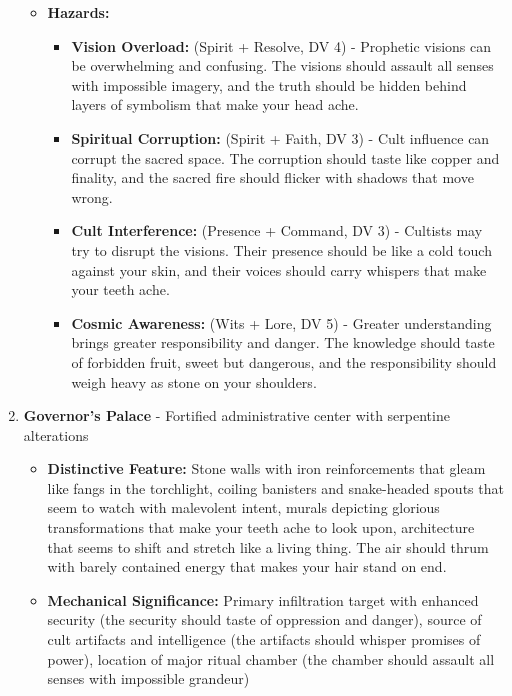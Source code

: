 \documentclass[11pt]{article}
\begin{document}
\begin{enumerate}
\begin{itemize}
  \item \textbf{Hazards:}
    \begin{itemize}
    \item \textbf{Vision Overload:} (Spirit + Resolve, DV 4) - Prophetic visions can be overwhelming and confusing. The visions should assault all senses with impossible imagery, and the truth should be hidden behind layers of symbolism that make your head ache.
    \item \textbf{Spiritual Corruption:} (Spirit + Faith, DV 3) - Cult influence can corrupt the sacred space. The corruption should taste like copper and finality, and the sacred fire should flicker with shadows that move wrong.
    \item \textbf{Cult Interference:} (Presence + Command, DV 3) - Cultists may try to disrupt the visions. Their presence should be like a cold touch against your skin, and their voices should carry whispers that make your teeth ache.
    \item \textbf{Cosmic Awareness:} (Wits + Lore, DV 5) - Greater understanding brings greater responsibility and danger. The knowledge should taste of forbidden fruit, sweet but dangerous, and the responsibility should weigh heavy as stone on your shoulders.
    \end{itemize}
  \end{itemize}
\item \textbf{Governor's Palace} - Fortified administrative center with serpentine alterations
  \begin{itemize}
  \item \textbf{Distinctive Feature:} Stone walls with iron reinforcements that gleam like fangs in the torchlight, coiling banisters and snake-headed spouts that seem to watch with malevolent intent, murals depicting glorious transformations that make your teeth ache to look upon, architecture that seems to shift and stretch like a living thing. The air should thrum with barely contained energy that makes your hair stand on end.
  \item \textbf{Mechanical Significance:} Primary infiltration target with enhanced security (the security should taste of oppression and danger), source of cult artifacts and intelligence (the artifacts should whisper promises of power), location of major ritual chamber (the chamber should assault all senses with impossible grandeur)

\end{itemize}
\end{enumerate}
\end{document}
